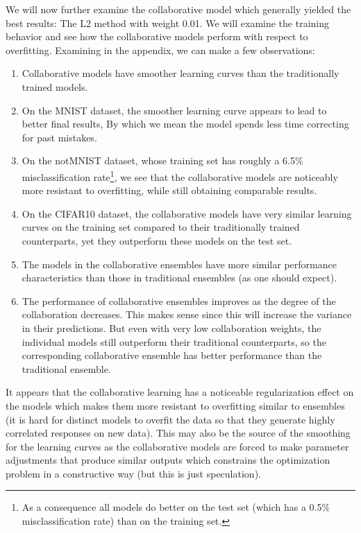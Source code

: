 \documentclass[english,a4paper,oneside]{amsart}
\theoremstyle{definition}
\begin{document}
We will now further examine the collaborative model which generally yielded the best results: The L2 method with weight 0.01. We will examine the training behavior and see how the collaborative models perform with respect to overfitting.  Examining  in the appendix, we can make a few observations:
\begin{enumerate}
	\item Collaborative models have smoother learning curves than the traditionally trained models.
	\item On the MNIST dataset, the smoother learning curve appears to lead to better final results, By which we mean the model spends less time correcting for past mistakes.
	\item On the notMNIST dataset, whose training set has roughly a 6.5\% misclassification rate\footnote{As a consequence all models do better on the test set (which has a 0.5\% misclassification rate) than on the training set.}, we see that the collaborative models are noticeably more resistant to overfitting, while still obtaining comparable results.
	\item On the CIFAR10 dataset, the collaborative models have very similar learning curves on the training set compared to their traditionally trained counterparts, yet they outperform these models on the test set.
	\item The models in the collaborative ensembles have more similar performance characteristics than those in traditional ensembles (as one should expect).
	\item The performance of collaborative ensembles improves as the degree of the collaboration decreases. This makes sense since this will increase the variance in their predictions. But even with very low collaboration weights, the individual models still outperform their traditional counterparts, so the corresponding collaborative ensemble has better performance than the traditional ensemble.
\end{enumerate}
It appears that the collaborative learning has a noticeable regularization effect on the models which makes them more resistant to overfitting similar to ensembles (it is hard for distinct models to overfit the data so that they generate highly correlated responses on new data). This may also be the source of the smoothing for the learning curves as the collaborative models are forced to make parameter adjustments that produce similar outputs which constrains the optimization problem in a constructive way (but this is just speculation).
\end{document}
